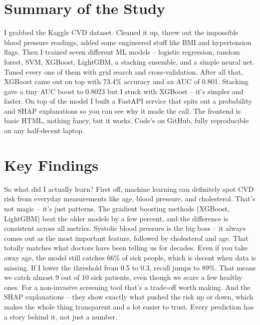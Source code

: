 \documentclass[11pt, a4paper, oneside]{book}
\begin{document}
\section{Summary of the Study}
I grabbed the Kaggle CVD dataset. Cleaned it up, threw out the impossible blood pressure readings, added some engineered stuff like BMI and hypertension flags. Then I trained seven different ML models – logistic regression, random forest, SVM, XGBoost, LightGBM, a stacking ensemble, and a simple neural net. Tuned every one of them with grid search and cross‑validation. After all that, XGBoost came out on top with 73.4\% accuracy and an AUC of 0.801. Stacking gave a tiny AUC boost to 0.8023 but I stuck with XGBoost – it’s simpler and faster. On top of the model I built a FastAPI service that spits out a probability and SHAP explanations so you can see why it made the call. The frontend is basic HTML, nothing fancy, but it works. Code’s on GitHub, fully reproducible on any half‑decent laptop.

\section{Key Findings}
So what did I actually learn? First off, machine learning can definitely spot CVD risk from everyday measurements like age, blood pressure, and cholesterol. That’s not magic – it’s just patterns. The gradient boosting methods (XGBoost, LightGBM) beat the older models by a few percent, and the difference is consistent across all metrics. Systolic blood pressure is the big boss – it always comes out as the most important feature, followed by cholesterol and age. That totally matches what doctors have been telling us for decades. Even if you take away age, the model still catches 66\% of sick people, which is decent when data is missing. If I lower the threshold from 0.5 to 0.3, recall jumps to 89\%. That means we catch almost 9 out of 10 sick patients, even though we scare a few healthy ones. For a non‑invasive screening tool that’s a trade‑off worth making. And the SHAP explanations – they show exactly what pushed the risk up or down, which makes the whole thing transparent and a lot easier to trust. Every prediction has a story behind it, not just a number.
\end{document}
